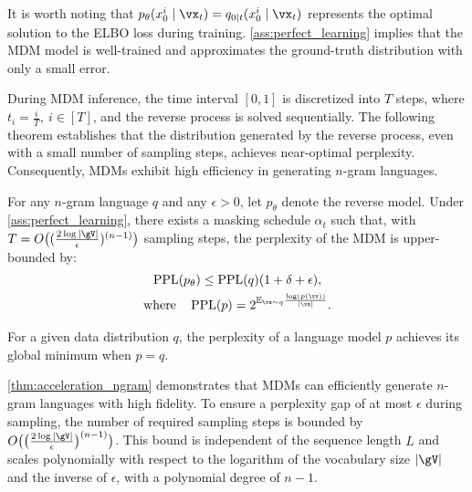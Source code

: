 It is worth noting that $p_\mathbf{\theta}(x_0^i \mid \vx_t) = q_{0|t}(x_0^i \mid \vx_t)$ represents the optimal solution to the ELBO loss during training. \cref{ass:perfect_learning} implies that the MDM model is well-trained and approximates the ground-truth distribution with only a small error.

During MDM inference, the time interval $[0, 1]$ is discretized into $T$ steps, where $t_i = \frac{i}{T},\ i \in [T]$, and the reverse process is solved sequentially. The following theorem establishes that the distribution generated by the reverse process, even with a small number of sampling steps, achieves near-optimal perplexity. Consequently, MDMs exhibit high efficiency in generating $n$-gram languages.

\begin{theorem}
\label{thm:acceleration_ngram}
    For any $n$-gram language $q$ and any $\epsilon > 0$, let $p_\mathsf{\theta}$ denote the reverse model. Under \cref{ass:perfect_learning}, there exists a masking schedule $\alpha_t$ such that, with $T = O\big( (\frac{2\log|\gV|}{\epsilon})^{(n-1)} \big)$ sampling steps, the perplexity of the MDM is upper-bounded by:
    \begin{equation}
        \begin{gathered}
            \operatorname{PPL}(p_\mathsf{\theta}) \leq \operatorname{PPL}(q) (1 + \delta + \epsilon), \\
            \text{where} \quad \operatorname{PPL}(p) = 2^{\mathbb{E}_{\vx \sim q} \frac{\log (p(\vx))}{|\vx|}}.
        \end{gathered}
    \end{equation}
\end{theorem}

\begin{remark}
For a given data distribution $q$, the perplexity of a language model $p$ achieves its global minimum when $p = q$.
\end{remark}

\cref{thm:acceleration_ngram} demonstrates that MDMs can efficiently generate $n$-gram languages with high fidelity. To ensure a perplexity gap of at most $\epsilon$ during sampling, the number of required sampling steps is bounded by $O\big( \big(\frac{2 \log |\gV|}{\epsilon}\big)^{(n-1)} \big)$. This bound is independent of the sequence length $L$ and scales polynomially with respect to the logarithm of the vocabulary size $|\gV|$ and the inverse of $\epsilon$, with a polynomial degree of \(n-1\).

